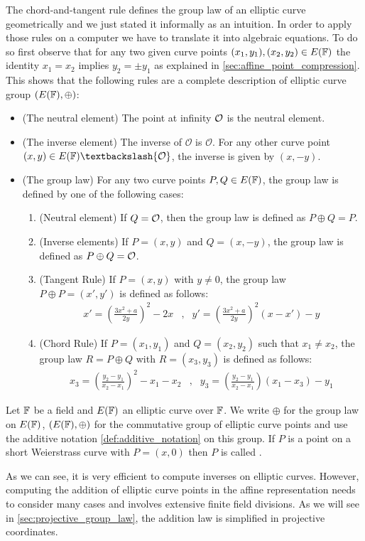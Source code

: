 The chord-and-tangent rule defines the group law of an elliptic curve geometrically and we just stated it informally as an intuition. In order to apply those rules on a computer we have to translate it into algebraic equations. To do so first observe that for any two given curve points $(x_1,y_1), (x_2,y_2)\in E(\mathbb{F})$ the identity $x_1=x_2$ implies $y_2=\pm y_1$ as explained in \ref{sec:affine_point_compression}. This shows that the following rules are a complete description of elliptic curve group $(E(\mathbb{F}),\oplus)$:
\begin{itemize}
\label{def:chord-tangent-algebra}
\item (The neutral element) The point at infinity $\mathcal{O}$ is the neutral element.
\item (The inverse element) The inverse of $\mathcal{O}$ is $\mathcal{O}$. For any other curve point $(x,y) \in E(\F)\textbackslash \{\mathcal{O}\}$, the inverse is given by $(x,-y)$.
\item (The group law) For any two curve points $P, Q \in E(\mathbb{F})$, the group law is defined by one of the following cases:
\begin{enumerate}
\item (Neutral element) If $Q=\mathcal{O}$, then the group law is defined as $P\oplus Q=P$.
\item (Inverse elements)  If $P=(x,y)$ and $Q=(x,-y)$, the group law is defined as $P\oplus Q=\mathcal{O}$.
\item (Tangent Rule) If $P=(x,y)$ with $y\neq 0$, the group law $P\oplus P=(x',y')$ is defined as follows:
$$
\begin{array}{llr}
x' = \left(\frac{3x^2+a}{2y}\right)^2 -2x &,&
y' = \left(\frac{3x^2+a}{2y}\right)^2\left(x-x'\right) - y
\end{array} 
$$
\item (Chord Rule) If $P=(x_1,y_1)$ and $Q=(x_2,y_2)$ such that $x_1 \neq x_2$, the group law $R=P\oplus Q$ with $R=(x_3,y_3)$ is defined as follows:
$$
\begin{array}{llr}
x_3 = \left(\frac{y_2-y_1}{x_2-x_1}\right)^2 -x_1-x_2 &, &
y_3 = \left(\frac{y_2-y_1}{x_2-x_1} \right)\left(x_1-x_3\right) - y_1
\end{array} 
$$
\end{enumerate}
\end{itemize}
\begin{notation}
Let $\mathbb{F}$ be a field and $E(\mathbb{F})$ an elliptic curve over $\mathbb{F}$. We write $\oplus$ for the group law on $E(\mathbb{F})$, $(E(\mathbb{F}),\oplus)$ for the commutative group of elliptic curve points and use the additive notation \ref{def:additive_notation} on this group. If $P$ is a point on a short Weierstrass curve with $P=(x,0)$ then $P$ is called .
\end{notation}
As we can see, it is very efficient to compute inverses on elliptic curves. However, computing the addition of elliptic curve points in the affine representation needs to consider many cases and involves extensive finite field divisions. As we will see in \ref{sec:projective_group_law}, the addition law is simplified in projective coordinates.

